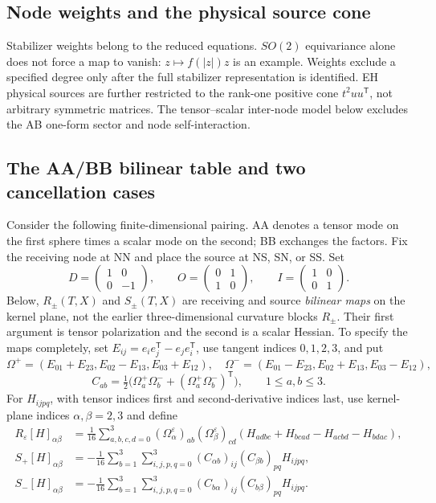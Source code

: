 \documentclass[a4paper,11pt]{article}
\numberwithin{equation}{section}
\theoremstyle{definition}
\begin{document}
\subsection{Node weights and the physical source cone}
Stabilizer weights belong to the reduced equations. $SO(2)$ equivariance alone does not force a map to vanish: $z\mapsto f(|z|)z$ is an example. Weights exclude a specified degree only after the full stabilizer representation is identified. EH physical sources are further restricted to the rank-one positive cone $t^2uu^{\mathsf T}$, not arbitrary symmetric matrices. The tensor--scalar inter-node model below excludes the AB one-form sector and node self-interaction.

\subsection{The AA/BB bilinear table and two cancellation cases}\label{sec:chiralitytable}
Consider the following finite-dimensional pairing. AA denotes a tensor mode on the first sphere times a scalar mode on the second; BB exchanges the factors. Fix the receiving node at NN and place the source at NS, SN, or SS. Set
\[
D=\begin{pmatrix}1&0\\0&-1\end{pmatrix},\qquad
O=\begin{pmatrix}0&1\\1&0\end{pmatrix},\qquad
I=\begin{pmatrix}1&0\\0&1\end{pmatrix}.
\]
Below, $R_\pm(T,X)$ and $S_\pm(T,X)$ are receiving and source \emph{bilinear maps} on the kernel plane, not the earlier three-dimensional curvature blocks $R_\pm$. Their first argument is tensor polarization and the second is a scalar Hessian. To specify the maps completely, set $E_{ij}=e_i e_j^{\mathsf T}-e_j e_i^{\mathsf T}$, use tangent indices $0,1,2,3$, and put
\[
\Omega^+=(E_{01}+E_{23},E_{02}-E_{13},E_{03}+E_{12}),\quad
\Omega^-=(E_{01}-E_{23},E_{02}+E_{13},E_{03}-E_{12}),
\]
\[
C_{ab}=\tfrac12\bigl(\Omega_a^+\Omega_b^-+
(\Omega_a^+\Omega_b^-)^{\mathsf T}\bigr),\qquad 1\le a,b\le3.
\]
For $H_{ijpq}$, with tensor indices first and second-derivative indices last, use kernel-plane indices $\alpha,\beta=2,3$ and define
\begin{align*}
R_\varepsilon[H]_{\alpha\beta}
&=\frac1{16}\sum_{a,b,c,d=0}^3
(\Omega_\alpha^\varepsilon)_{ab}(\Omega_\beta^\varepsilon)_{cd}
(H_{adbc}+H_{bcad}-H_{acbd}-H_{bdac}),\\
S_+[H]_{\alpha\beta}
&=-\frac1{16}\sum_{b=1}^3\sum_{i,j,p,q=0}^3
(C_{\alpha b})_{ij}(C_{\beta b})_{pq}H_{ijpq},\\
S_-[H]_{\alpha\beta}
&=-\frac1{16}\sum_{b=1}^3\sum_{i,j,p,q=0}^3
(C_{b\alpha})_{ij}(C_{b\beta})_{pq}H_{ijpq}.
\end{align*}
\end{document}
